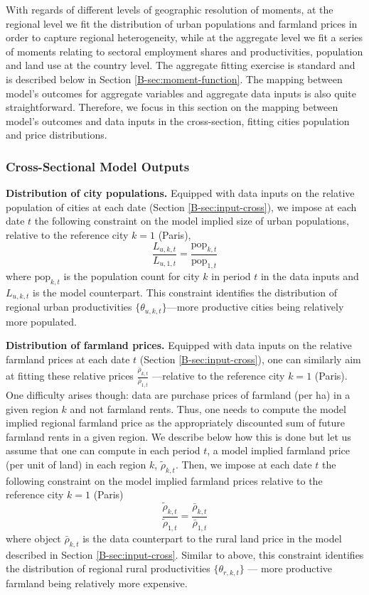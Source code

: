 \documentclass[11pt]{report}
\begin{document}
With regards of different levels of geographic resolution of moments, at the regional level we fit the distribution of urban populations and farmland prices in order to capture regional heterogeneity, while at the aggregate level we fit a series of moments relating to sectoral employment shares and productivities, population and land use at the country level. The aggregate fitting exercise is standard and is described below in Section \ref{B-sec:moment-function}. The mapping between model's outcomes for aggregate variables and aggregate data inputs is also quite straightforward. Therefore, we focus in this section on the mapping between model's outcomes and data inputs in the cross-section, fitting cities population and price distributions.

\subsubsection{Cross-Sectional Model Outputs}

\textbf{Distribution of city populations.} Equipped with data inputs on the relative population of cities at each date (Section \ref{B-sec:input-cross}), we impose at each date $t$ the following constraint on the model implied size of urban populations, relative to the reference city $k=1$ (Paris),
\begin{equation}
\frac{L_{u,k,t}}{L_{u,1,t}} = \frac{\text{pop}_{k,t}}{\text{pop}_{1,t}}  \label{B-eq:Lu-constraint}
\end{equation}
where $\text{pop}_{k,t}$ is the population count for city $k$ in period $t$ in the data inputs and $L_{u,k,t}$ is the model counterpart. This constraint identifies the distribution of regional urban productivities $\{\theta_{u,k,t}\}$---more productive cities being relatively more populated.

\textbf{Distribution of farmland prices.} Equipped with data inputs on the relative farmland prices at each date $t$ (Section \ref{B-sec:input-cross}), one can similarly aim at fitting these relative prices $\frac{\bar{\rho}_{k,t}}{\bar{\rho}_{1,t}}$ ---relative to the reference city $k=1$ (Paris). One difficulty arises though: data are purchase prices of farmland (per ha) in a given region $k$ and not farmland rents. Thus, one needs to compute the model implied regional farmland price as the appropriately discounted sum of future farmland rents in a given region. We describe below how this is done but let us assume that one can compute in each period $t$, a model implied farmland price (per unit of land) in each region $k$, $\tilde{\rho}_{k,t}$. Then, we impose at each date $t$ the following constraint on the model implied farmland prices relative to the reference city $k=1$ (Paris)
\begin{equation}
\frac{\tilde{\rho}_{k,t}}{\tilde{\rho}_{1,t}} = \frac{\bar{\rho}_{k,t}}{\bar{\rho}_{1,t}}  \label{B-eq:price-constraint}
\end{equation}
where object $\bar{\rho}_{k,t}$ is the data counterpart to the rural land price in the model described in Section \ref{B-sec:input-cross}. Similar to above, this constraint identifies the distribution of regional rural productivities $\{\theta_{r,k,t}\}$ --- more productive farmland being relatively more expensive.
\end{document}
